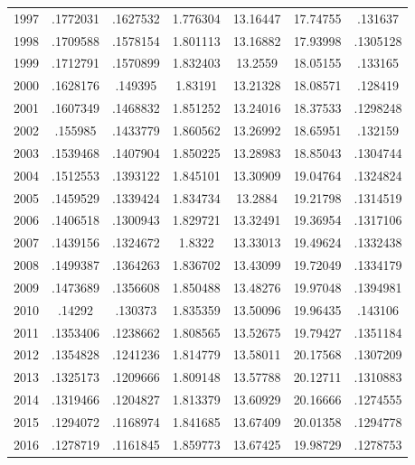 {\begin{longtable}{l*{1}{cccccc}}
1997        &    .1772031&    .1627532&    1.776304&    13.16447&    17.74755&     .131637\\
1998        &    .1709588&    .1578154&    1.801113&    13.16882&    17.93998&    .1305128\\
1999        &    .1712791&    .1570899&    1.832403&     13.2559&    18.05155&     .133165\\
2000        &    .1628176&     .149395&     1.83191&    13.21328&    18.08571&     .128419\\
2001        &    .1607349&    .1468832&    1.851252&    13.24016&    18.37533&    .1298248\\
2002        &     .155985&    .1433779&    1.860562&    13.26992&    18.65951&     .132159\\
2003        &    .1539468&    .1407904&    1.850225&    13.28983&    18.85043&    .1304744\\
2004        &    .1512553&    .1393122&    1.845101&    13.30909&    19.04764&    .1324824\\
2005        &    .1459529&    .1339424&    1.834734&     13.2884&    19.21798&    .1314519\\
2006        &    .1406518&    .1300943&    1.829721&    13.32491&    19.36954&    .1317106\\
2007        &    .1439156&    .1324672&      1.8322&    13.33013&    19.49624&    .1332438\\
2008        &    .1499387&    .1364263&    1.836702&    13.43099&    19.72049&    .1334179\\
2009        &    .1473689&    .1356608&    1.850488&    13.48276&    19.97048&    .1394981\\
2010        &      .14292&     .130373&    1.835359&    13.50096&    19.96435&     .143106\\
2011        &    .1353406&    .1238662&    1.808565&    13.52675&    19.79427&    .1351184\\
2012        &    .1354828&    .1241236&    1.814779&    13.58011&    20.17568&    .1307209\\
2013        &    .1325173&    .1209666&    1.809148&    13.57788&    20.12711&    .1310883\\
2014        &    .1319466&    .1204827&    1.813379&    13.60929&    20.16666&    .1274555\\
2015        &    .1294072&    .1168974&    1.841685&    13.67409&    20.01358&    .1294778\\
2016        &    .1278719&    .1161845&    1.859773&    13.67425&    19.98729&    .1278753\\

\end{longtable}}
